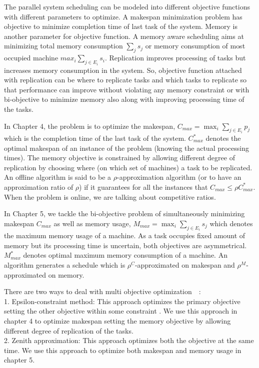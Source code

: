  
 
 The  parallel system scheduling can be modeled into different objective functions with different parameters to optimize. A makespan minimization problem has objective to minimize completion time of last task of the system. Memory is another parameter for objective function. A memory aware scheduling aims at minimizing total memory consumption $\sum_{j}^{}s_j$ or memory consumption of most occupied machine $max_i\sum_{j\in E_i}^{}s_i$. Replication improves processing of tasks but increases memory consumption in the system. So, objective function attached with replication can be where to replicate tasks and which tasks to replicate so that performance can improve without violating any memory constraint or with bi-objective to minimize memory also along with improving processing time of the tasks.
 
 
 In Chapter 4, the problem is to optimize the makespan, $C_{max} = \max_i \sum_{j \in
    E_i} p_j$ which is the completion time of the last task of the
  system. $C_{max}^{*}$ denotes the optimal makespan of an instance of
  the problem (knowing the actual processing times). The memory objective is constrained by allowing different degree of replication by choosing where (on which set of machines) a task to be replicated. An offline algorithm is
  said to be a $\rho$-approximation algorithm (or to have an
  approximation ratio of $\rho$) if it guarantees for all the instances
  that $C_{max} \leq \rho C_{max}^*$. When the problem is online, we are
  talking about competitive ratios.
  
  In Chapter 5, we tackle the bi-objective problem of simultaneously minimizing makespan $C_{max}$ as well as memory usage, $M_{max}= \max_i \sum_{j \in E_i} s_j$ which denotes the maximum memory usage of a machine. As a task occupies fixed amount of memory but its processing time is uncertain, both objectives are asymmetrical.  $M^*_{max}$ denotes optimal maximum memory consumption of a machine. An algorithm generates a schedule which is $\rho^C$-approximated  on makespan and $\rho^M$-approximated on memory.
  
  There are two ways to deal with multi objective optimization~\cite{tkindtbillaut-book}~\cite{DRST09}:\\
  1. Epsilon-constraint method: This approach optimizes the primary objective  setting the other objective within some constraint . 
  We use this approach in chapter 4 to optimize makespan setting the memory objective by allowing different degree of replication of the tasks.\\
  2. Zenith approximation: This approach optimizes both the objective at the same time. 
  We use this approach to optimize both makespan and memory usage in chapter 5.